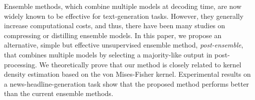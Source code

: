 Ensemble methods, which combine multiple models at decoding time, are now widely known to be effective for text-generation tasks. However, they generally increase computational costs, and thus, there have been many studies on compressing or distilling ensemble models. In this paper, we propose an alternative, simple but effective unsupervised ensemble method, {\em post-ensemble}, that combines multiple models by selecting a majority-like output in post-processing. We theoretically prove that our method is closely related to kernel density estimation based on the von Mises-Fisher kernel. Experimental results on a news-headline-generation task show that the proposed method performs better than the current ensemble methods.

